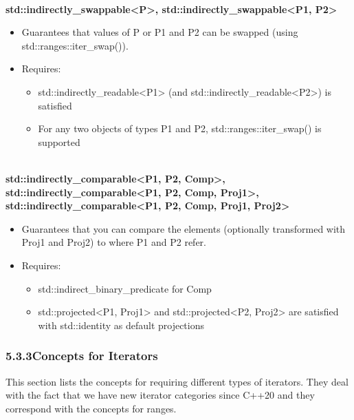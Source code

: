 \noindent
\hspace*{\fill} \\ %
\textbf{std::indirectly\_swappable<P>, std::indirectly\_swappable<P1, P2>}

\begin{itemize}
\item
Guarantees that values of P or P1 and P2 can be swapped (using std::ranges::iter\_swap()).

\item
Requires:
\begin{itemize}
\item
std::indirectly\_readable<P1> (and std::indirectly\_readable<P2>) is satisfied

\item
For any two objects of types P1 and P2, std::ranges::iter\_swap() is supported
\end{itemize}
\end{itemize}

\noindent
\hspace*{\fill} \\ %
\textbf{std::indirectly\_comparable<P1, P2, Comp>, std::indirectly\_comparable<P1, P2, Comp, Proj1>, std::indirectly\_comparable<P1, P2, Comp, Proj1, Proj2>}

\begin{itemize}
\item
Guarantees that you can compare the elements (optionally transformed with Proj1 and Proj2) to where P1 and P2 refer.

\item
Requires:
\begin{itemize}
\item
std::indirect\_binary\_predicate for Comp

\item
std::projected<P1, Proj1> and std::projected<P2, Proj2> are satisfied with std::identity as default projections
\end{itemize}
\end{itemize}

\subsubsection*{ 5.3.3\hspace{0.2cm}Concepts for Iterators}

This section lists the concepts for requiring different types of iterators. They deal with the fact that we have new iterator categories since C++20 and they correspond with the concepts for ranges.

